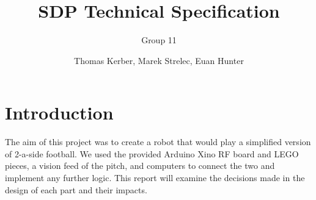 \documentclass[a4paper,12pt]{scrartcl}
\author{Thomas Kerber, Marek Strelec, Euan Hunter}
\title{SDP Technical Specification}
\subtitle{Group 11}
\begin{document}
\maketitle

\section{Introduction}

The aim of this project was to create a robot that would play a simplified
version of 2-a-side football. We used the provided Arduino Xino RF board and
LEGO pieces, a vision feed of the pitch, and computers to connect the two and
implement any further logic. This report will examine the decisions made in the
design of each part and their impacts.







\pagebreak


\pagebreak
\appendix




%
\end{document}
